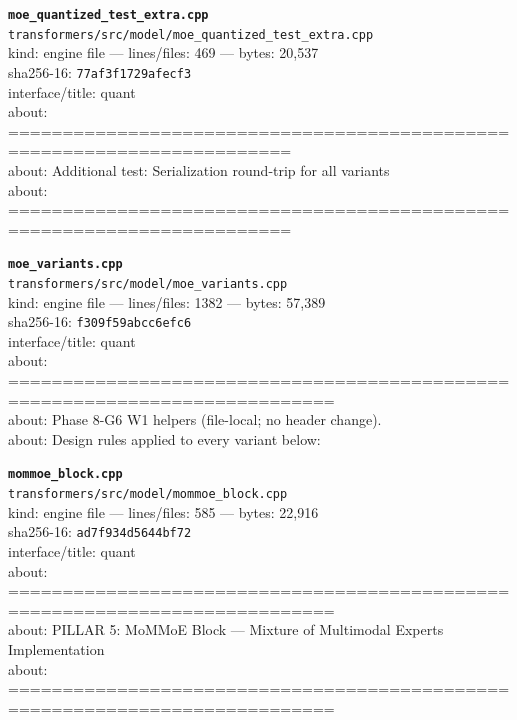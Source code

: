 \noindent\textbf{\texttt{moe\_quantized\_test\_extra.cpp}}\\
\texttt{transformers/src/model/moe\_quantized\_test\_extra.cpp}\\
kind: engine file --- lines/files: 469 --- bytes: 20,537\\
sha256-16: \texttt{77af3f1729afecf3}\\
interface/title: quant\\
about: ========================================================================\\
about: Additional test: Serialization round-trip for all variants\\
about: ========================================================================\\
\vspace*{6.0pt}

\noindent\textbf{\texttt{moe\_variants.cpp}}\\
\texttt{transformers/src/model/moe\_variants.cpp}\\
kind: engine file --- lines/files: 1382 --- bytes: 57,389\\
sha256-16: \texttt{f309f59abcc6efc6}\\
interface/title: quant\\
about: ============================================================================\\
about: Phase 8-G6 W1 helpers (file-local; no header change).\\
about: Design rules applied to every variant below:\\
\vspace*{6.0pt}

\noindent\textbf{\texttt{mommoe\_block.cpp}}\\
\texttt{transformers/src/model/mommoe\_block.cpp}\\
kind: engine file --- lines/files: 585 --- bytes: 22,916\\
sha256-16: \texttt{ad7f934d5644bf72}\\
interface/title: quant\\
about: ============================================================================\\
about: PILLAR 5: MoMMoE Block — Mixture of Multimodal Experts Implementation\\
about: ============================================================================\\
\vspace*{6.0pt}
\newpage


